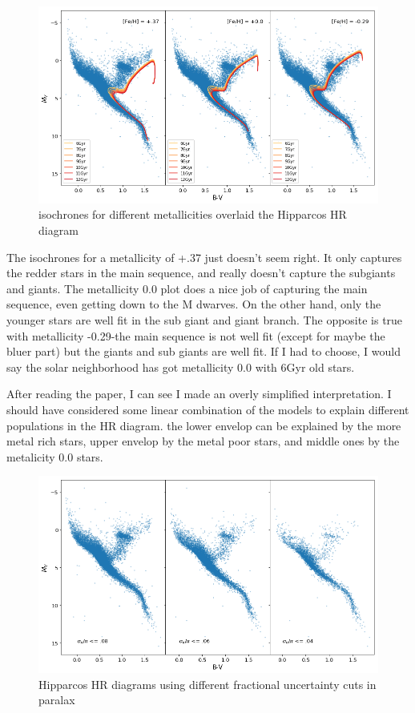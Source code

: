 \documentclass[12pt]{article}
\begin{document}
\begin{figure}
\centering
\includegraphics[width=6in]{isochrones.png}
\caption{isochrones for different metallicities overlaid the Hipparcos HR diagram}
\end{figure}

The isochrones for a metallicity of +.37 just doesn't seem right. It only captures the redder stars in the main sequence, and really doesn't capture the subgiants and giants. The metallicity 0.0 plot does a nice job of capturing the main sequence, even getting down to the M dwarves. On the other hand, only the younger stars are well fit in the sub giant and giant branch. The opposite is true with metallicity -0.29-the main sequence is not well fit (except for maybe the bluer part) but the giants and sub giants are well fit. If I had to choose, I would say the solar neighborhood has got metallicity 0.0 with 6Gyr old stars.

After reading the paper, I can see I made an overly simplified interpretation. I should have considered some linear combination of the models to explain different populations in the HR diagram. the lower envelop can be explained by the more metal rich stars, upper envelop by the metal poor stars, and middle ones by the metalicity 0.0 stars. 

\begin{figure}
\centering
\includegraphics[width=6in]{hrpannels.png}
\caption{Hipparcos HR diagrams using different fractional uncertainty cuts in paralax}
\end{figure}
\end{document}
